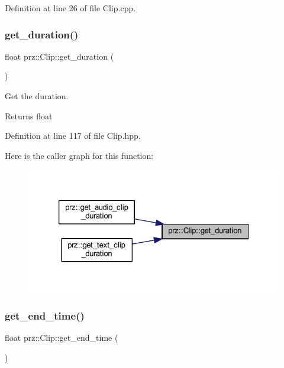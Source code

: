Definition at line 26 of file Clip.\+cpp.

\mbox{\label{classprz_1_1_clip_a6e870ff68a0f4ff4759007ddb4853f03}} 
\subsubsection{\texorpdfstring{get\_duration()}{get\_duration()}}
{\footnotesize\ttfamily float prz\+::\+Clip\+::get\+\_\+duration (\begin{DoxyParamCaption}{ }\end{DoxyParamCaption})\hspace{0.3cm}{\ttfamily [inline]}}



Get the duration. 

\begin{DoxyReturn}{Returns}
float 
\end{DoxyReturn}


Definition at line 117 of file Clip.\+hpp.

Here is the caller graph for this function\+:
\nopagebreak
\begin{figure}[H]
\begin{center}
\leavevmode
\includegraphics[width=326pt]{classprz_1_1_clip_a6e870ff68a0f4ff4759007ddb4853f03_icgraph}
\end{center}
\end{figure}
\mbox{\label{classprz_1_1_clip_acfe08e188c11afa8ca32b334907fe9f9}} 
\subsubsection{\texorpdfstring{get\_end\_time()}{get\_end\_time()}}
{\footnotesize\ttfamily float prz\+::\+Clip\+::get\+\_\+end\+\_\+time (\begin{DoxyParamCaption}{ }\end{DoxyParamCaption})\hspace{0.3cm}{\ttfamily [inline]}}



